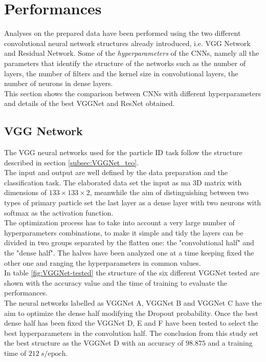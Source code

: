 \section{Performances}\label{sec:NN_perf}
Analyses on the prepared data have been performed using the two different convolutional neural network structures already introduced, i.e. VGG Network and Residual Network. Some of the \textit{hyperparameters} of the CNNs, namely all the parameters that identify the structure of the networks such as the number of layers, the number of filters and the kernel size in convolutional layers, the number of neurons in dense layers.\\
This section shows the comparison between CNNs with different hyperparameters and details of the best VGGNet and ResNet obtained.

\subsection{VGG Network}
The VGG neural networks used for the particle ID task follow the structure described in section \ref{subsec:VGGNet_teo}.\\
The input and output are well defined by the data preparation and the classification task. The elaborated data set the input as ma 3D matrix with dimensions of $133\times 133\times 2$, meanwhile the aim of distinguishing between two types of primary particle set the last layer as a dense layer with two neurons with softmax as the activation function.\\
The optimization process has to take into account a very large number of hyperparameters combinations, to make it simple and tidy the layers can be divided in two groups separated by the flatten one: the "convolutional half" and the "dense half". The halves have been analyzed one at a time keeping fixed the other one and ranging the hyperparameters in common values.\\
In table \ref{fig:VGGNet-tested} the structure of the six different VGGNet tested are shown with the accuracy value and the time of training to evaluate the performances.\\
The neural networks labelled as VGGNet A, VGGNet B and VGGNet C have the aim to optimize the dense half modifying the Dropout probability. Once the best dense half has been fixed the VGGNet D, E and F have been tested to select the best hyperparameters in the convolution half. The conclusion from this study set the best structure as the VGGNet D with an accuracy of $98.875$ and a training time of $212\ s/\text{epoch}$.\\

